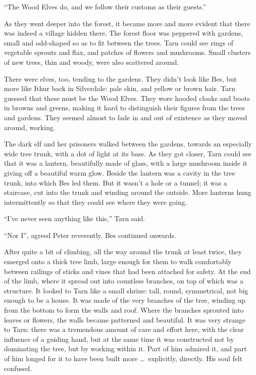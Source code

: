 ``The Wood Elves do, and we follow their customs as their guests.''

As they went deeper into the forest, it became more and more evident that there was indeed a village hidden there.  The forest floor was peppered with gardens, small and odd-shaped so as to fit between the trees.  Tarn could see rings of vegetable sprouts and flax, and patches of flowers and mushrooms.  Small clusters of new trees, thin and woody, were also scattered around.

There were elves, too, tending to the gardens.  They didn't look like Bes, but more like Ithur back in Silverdale: pale skin, and yellow or brown hair.  Tarn guessed that these must be the Wood Elves.  They wore hooded cloaks and boots in browns and greens, making it hard to distinguish their figures from the trees and gardens.  They seemed almost to fade in and out of existence as they moved around, working.

The dark elf and her prisoners walked between the gardens, towards an especially wide tree trunk, with a dot of light at its base.  As they got closer, Tarn could see that it was a lantern, beautifully made of glass, with a large mushroom inside it giving off a beautiful warm glow.  Beside the lantern was a cavity in the tree trunk, into which Bes led them.  But it wasn't a hole or a tunnel; it was a staircase, cut into the trunk and winding around the outside.  More lanterns hung intermittently so that they could see where they were going.

``I've never seen anything like this,'' Tarn said.

``Nor I'', agreed Peter reverently.  Bes continued onwards.

After quite a bit of climbing, all the way around the trunk at least twice, they emerged onto a thick tree limb, large enough for them to walk comfortably between railings of sticks and vines that had been attached for safety.  At the end of the limb, where it spread out into countless branches, on top of which was a structure.  It looked to Tarn like a small shrine: tall, round, symmetrical, not big enough to be a house.  It was made of the very branches of the tree, winding up from the bottom to form the walls and roof.  Where the branches sprouted into leaves or flowers, the walls became patterned and beautiful.  It was very strange to Tarn: there was a tremendous amount of care and effort here, with the clear influence of a guiding hand, but at the same time it was constructed not by dominating the tree, but by working within it.  Part of him admired it, and part of him longed for it to have been built more \ldots\ explicitly, directly.  His soul felt confused.

